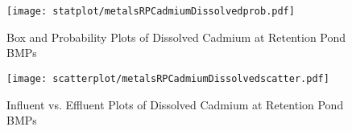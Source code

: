         \begin{figure}[hb]   %
            \centering
            \texttt{[image: statplot/metalsRPCadmiumDissolvedprob.pdf]}
            \caption{Box and Probability Plots of Dissolved Cadmium at Retention Pond BMPs}
        \end{figure}         %
        
        
        \begin{figure}[hb]   %
            \centering
            \texttt{[image: scatterplot/metalsRPCadmiumDissolvedscatter.pdf]}
            \caption{Influent vs. Effluent Plots of Dissolved Cadmium at Retention Pond BMPs}
        \end{figure}         %
        \clearpage
        
